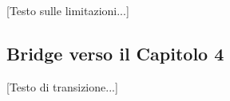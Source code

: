 [Testo sulle limitazioni...]

\subsection{Bridge verso il Capitolo 4}

[Testo di transizione...]



%
%
%


% 
%
%
%
%
